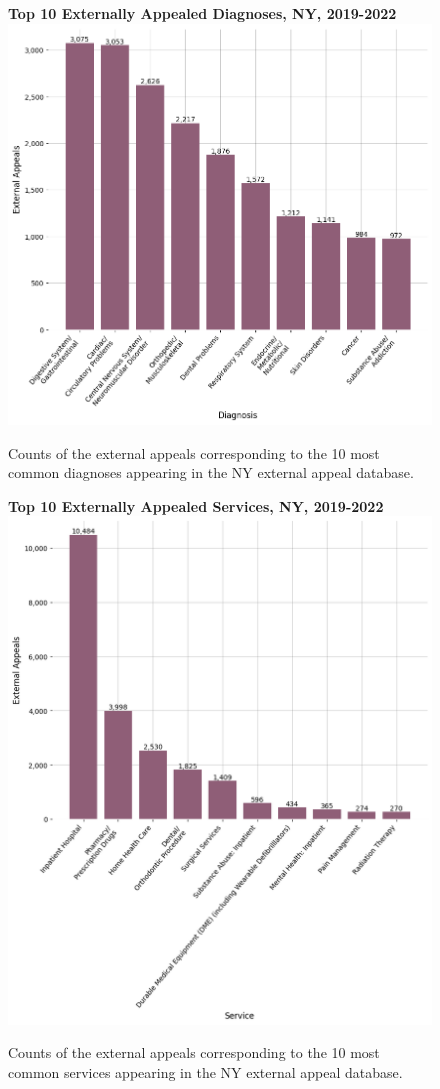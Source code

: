 \documentclass[12pt, a4paper,twoside]{report}
\theoremstyle{plain} %
\theoremstyle{definition} %
\theoremstyle{remark} %
\numberwithin{equation}{chapter}
\begin{document}
		\begin{figure}[h!]
			\centering
			\textbf{Top 10 Externally Appealed Diagnoses, NY, 2019-2022}
			\includegraphics[width=.8\textwidth]{images/nys_external/top_externally_appealed_diagnoses.png}
			\caption{Counts of the external appeals corresponding to the 10 most common diagnoses appearing in the NY external appeal database.}
			\label{nyexternalappealsbydiagnosis}
		\end{figure}
		
		
		\begin{figure}[h!]
			\centering
			\textbf{Top 10 Externally Appealed Services, NY, 2019-2022}
			\includegraphics[width=.8\textwidth]{images/nys_external/top_externally_appealed_treatments.png}
			\caption{Counts of the external appeals corresponding to the 10 most common services appearing in the NY external appeal database.}
			\label{nyexternalappealsbyservice}
		\end{figure}
		
\end{document}
